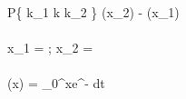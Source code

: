 \\ P\left \{
k_{1} \leqslant  k \leqslant k_{2}
\right \}
\approx \Phi(x_{2}) - \Phi(x_{1})
\\
\\ x_{1} = 
\; \; ; \; \;
x_{2} = 
\\
\\ \Phi(x) = \int_{0}^{x}e^{-} dt
